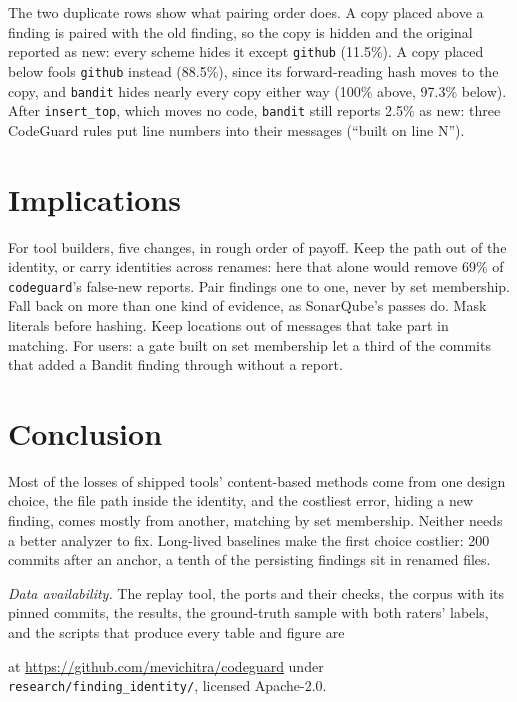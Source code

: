 \documentclass[conference]{IEEEtran}
\newif\ifanon
\begin{document}
The two duplicate rows show what pairing order does. A copy placed above a finding is
paired with the old finding, so the copy is hidden and the original reported as new:
every scheme hides it except \texttt{github} (11.5\%). A copy placed below fools
\texttt{github} instead (88.5\%), since its forward-reading hash moves to the copy, and
\texttt{bandit} hides nearly every copy either way (100\% above, 97.3\% below). After
\texttt{insert\_top}, which moves no code, \texttt{bandit} still reports 2.5\% as new:
three CodeGuard rules put line numbers into their messages (``built on line N'').

\section{Implications}\label{sec:implications}

For tool builders, five changes, in rough order of payoff. Keep the path out of the
identity, or carry identities across renames: here that alone would remove 69\% of
\texttt{codeguard}'s false-new reports. Pair findings one to
one, never by set membership. Fall back on more than one kind of evidence, as SonarQube's
passes do. Mask literals before hashing. Keep locations out of messages that take part
in matching. For users: a gate built on set membership let a third of the commits that
added a Bandit finding through without a report.





\section{Conclusion}\label{sec:conclusion}

Most of the losses of shipped tools' content-based methods come from one design choice,
the file path inside the identity, and the costliest error, hiding a new finding, comes
mostly from another, matching by set membership. Neither needs a better analyzer to fix.
Long-lived baselines make the first choice costlier: 200 commits after an anchor, a
tenth of the persisting findings sit in renamed files.

\textit{Data availability.} The replay tool, the ports and their checks, the corpus with
its pinned commits, the results, the ground-truth sample with both raters' labels, and
the scripts that produce every table and figure are
\ifanon
available to reviewers through the venue's anonymous artifact channel, licensed
Apache-2.0.
\else
at \url{https://github.com/mevichitra/codeguard} under
\texttt{research/finding\_identity/}, licensed Apache-2.0.
\fi



\end{document}
